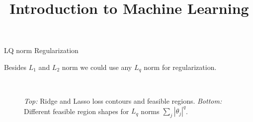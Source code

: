 



\newcommand{\titlefigure}{figure_man/lasso_ridge_hat.png}
\newcommand{\learninggoals}{
  \item Know LQ norm regularization
  \item Understand that L0 norm realization simply counts the number of non-zero parameters
}

\title{Introduction to Machine Learning}
\date{}




\begin{vbframe}{LQ norm Regularization} 

Besides $L_1$ and $L_2$ norm we could use any $L_q$ norm for regularization.

\begin{figure}
  \\
\caption{\textit{Top:} Ridge and Lasso loss contours and feasible regions.
  \textit{Bottom:} Different feasible region shapes for $L_q$ norms $\sum_j |\theta_j|^q$.}
\end{figure}
  
\end{vbframe}


